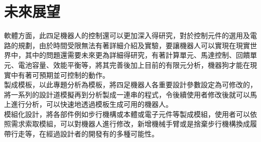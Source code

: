 \chapter{未來展望}
\hspace{-1.7em} 軟體方面，此四足機器人的控制還可以更加深入得研究，對於控制元件的選用及電路的規劃，由於時間受限無法有著詳細介紹及實驗，要讓機器人可以實現在現實世界中，其中的問題還需要未來更為詳細得研究，有著計算單元、馬達控制、回饋單元、電池容量、效能平衡等，將其完善後加上目前的有限元分析，機器狗才能在現實中有著可預期並可控制的動作。\\

\hspace{-1.4em} 製成模板，以此專題分析為模板，將四足機器人各重要設計參數設定為可修改的，將一系列的設計道模擬再到分析製成一連串的程式，令後續使用者修改後就可以馬上進行分析，可以快速地透過模板生成可用的機器人。\\

\hspace{-1.4em} 模組化設計，將各部件例如步行機構或本體或電子元件等製成模組，使用者可以依照需求索取模組，可以對機器人進行修改，新增機械手臂或是捨棄步行機構換成履帶行走等，在經過設計者的開發有的多種可能性。\\

\newpage
